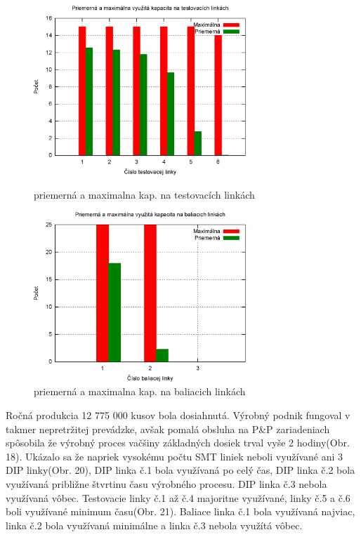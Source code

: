 \documentclass[12pt,a4paper,titlepage,final]{article}
\begin{document}
\begin{figure}[!ht]
  \centering
  \begin{minipage}{0.45\linewidth}
  \centering
  \includegraphics[width=8cm]{doc/3_hist5.eps}
  \caption{priemerná a maximalna kap. na testovacích linkách}
  \end{minipage}
  \quad
  \begin{minipage}{0.45\linewidth}
    \centering
    \includegraphics[width=8cm]{doc/3_hist6.eps}
    \caption{priemerná a maximalna kap. na baliacich linkách}
  \end{minipage}
\end{figure}

\newpage

Ročná produkcia 12 775 000 kusov bola dosiahnutá.
Výrobný podnik fungoval v takmer nepretržitej prevádzke,
avšak pomalá obsluha na P\&P zariadeniach spôsobila
že výrobný proces vačšiny základných dosiek trval vyše
2 hodiny(Obr. 18). Ukázalo sa že napriek vysokému počtu SMT liniek 
neboli využívané ani 3 DIP linky(Obr. 20), DIP linka č.1 bola využívaná 
po celý čas, DIP linka č.2 bola využívaná približne štvrtinu času
výrobného procesu. DIP linka č.3 nebola využívaná vôbec.
Testovacie linky č.1 až č.4 majoritne využívané, linky č.5 a č.6
boli využívané minimum času(Obr. 21). Baliace linka č.1 bola využívaná 
najviac, linka č.2 bola využívaná minimálne a linka č.3 nebola 
využítá vôbec.
\end{document}
